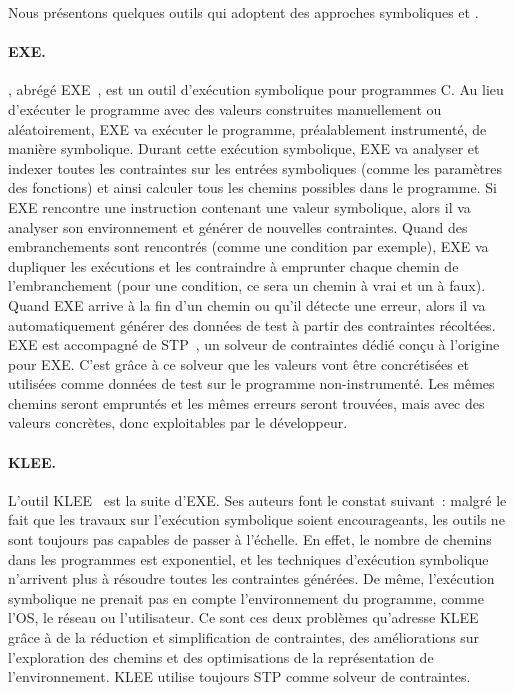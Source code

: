 Nous présentons quelques outils qui adoptent des approches symboliques et
.

\paragraph{EXE.} , abrégé
EXE~, est un outil d'exécution symbolique pour
programmes C. Au lieu d'exécuter le programme avec des valeurs construites
manuellement ou aléatoirement, EXE va exécuter le programme, préalablement
instrumenté, de manière symbolique. Durant cette exécution symbolique, EXE va
analyser et indexer toutes les contraintes sur les entrées symboliques (comme
les paramètres des fonctions) et ainsi calculer tous les chemins possibles dans
le programme.  Si EXE rencontre une instruction contenant une valeur symbolique,
alors il va analyser son environnement et générer de nouvelles contraintes.
Quand des embranchements sont rencontrés (comme une condition par exemple), EXE
va dupliquer les exécutions et les contraindre à emprunter chaque chemin de
l'embranchement (pour une condition, ce sera un chemin à vrai et un à faux).
Quand EXE arrive à la fin d'un chemin ou qu'il détecte une erreur, alors il va
automatiquement générer des données de test à partir des contraintes récoltées.
EXE est accompagné de STP~, un solveur de contraintes dédié
conçu à l'origine pour EXE. C'est grâce à ce solveur que les valeurs vont être
concrétisées et utilisées comme données de test sur le programme
non-instrumenté. Les mêmes chemins seront empruntés et les mêmes erreurs seront
trouvées, mais avec des valeurs concrètes, donc exploitables par le développeur.

\paragraph{KLEE.} L'outil KLEE~ est la suite d'EXE. Ses auteurs
font le constat suivant~: malgré le fait que les travaux sur l'exécution
symbolique soient encourageants, les outils ne sont toujours pas capables de
passer à l'échelle. En effet, le nombre de chemins dans les programmes est
exponentiel, et les techniques d'exécution symbolique n'arrivent plus à résoudre
toutes les contraintes générées. De même, l'exécution symbolique ne prenait pas
en compte l'environnement du programme, comme l'OS, le réseau ou l'utilisateur.
Ce sont ces deux problèmes qu'adresse KLEE grâce à de la réduction et
simplification de contraintes, des améliorations sur l'exploration des chemins
et des optimisations de la représentation de l'environnement. KLEE utilise
toujours STP comme solveur de contraintes.

